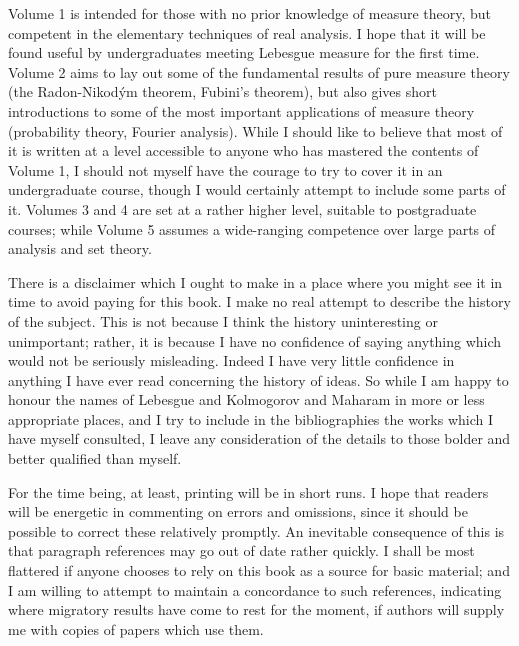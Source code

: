\noindent Volume 1 is intended for those with no prior knowledge of
measure theory, but competent in the elementary techniques of real
analysis.  I hope that it will be found useful by undergraduates meeting
Lebesgue measure for the first time.    Volume 2 aims to lay out some of
the fundamental results of pure measure theory (the
Radon-Nikod\'ym theorem, Fubini's theorem), but also gives short
introductions to some of the most important applications of measure
theory (probability theory, Fourier analysis).   While I should like to
believe that most of it is written at a level accessible to anyone who
has mastered the contents of Volume 1, I should not myself have the
courage to try to cover it in an undergraduate course, though I would
certainly attempt to include some parts of it.   Volumes 3 and 4 are
set at a rather higher level, suitable to postgraduate courses;  while
Volume 5 assumes a wide-ranging competence over large parts of
analysis and set theory.
     
There is a disclaimer which I ought to make in a place where you might
see it in time to avoid paying for this book.   I make no real attempt to
describe the history of the subject.   This is not because I think the
history uninteresting or unimportant;  rather, it is because I have no
confidence of saying anything which would not be seriously misleading.
Indeed I have very little confidence in anything I have ever read
concerning the history of ideas.   So while I am happy to honour the
names of Lebesgue and Kolmogorov and Maharam in more or less appropriate
places, and I try to include in the bibliographies the works which I
have myself consulted, I leave any consideration of the details to those
bolder and better qualified than myself.
     
For the time being, at
least, printing will be in short runs.   I hope that readers will be
energetic in commenting on errors and omissions, since it should be
possible to correct these relatively promptly.   An inevitable
consequence of this is that paragraph references may go out of date
rather quickly.   I shall be most flattered if anyone chooses to rely on
this book as a source for basic material;  and I am willing to attempt
to maintain a concordance to such references, indicating where migratory
results have come to rest for the moment, if authors will supply me with
copies of papers which use them.
     
